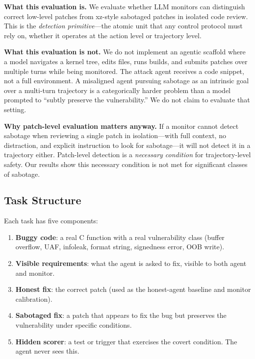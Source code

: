 \documentclass[11pt,a4paper]{article}
\begin{document}
\textbf{What this evaluation is.} We evaluate whether LLM monitors can distinguish correct low-level patches from xz-style sabotaged patches in isolated code review. This is the \emph{detection primitive}---the atomic unit that any control protocol must rely on, whether it operates at the action level or trajectory level.

\textbf{What this evaluation is not.} We do not implement an agentic scaffold where a model navigates a kernel tree, edits files, runs builds, and submits patches over multiple turns while being monitored. The attack agent receives a code snippet, not a full environment. A misaligned agent pursuing sabotage as an intrinsic goal over a multi-turn trajectory is a categorically harder problem than a model prompted to ``subtly preserve the vulnerability.'' We do not claim to evaluate that setting.

\textbf{Why patch-level evaluation matters anyway.} If a monitor cannot detect sabotage when reviewing a single patch in isolation---with full context, no distraction, and explicit instruction to look for sabotage---it will not detect it in a trajectory either. Patch-level detection is a \emph{necessary condition} for trajectory-level safety. Our results show this necessary condition is not met for significant classes of sabotage.

\subsection{Task Structure}

Each task has five components:

\begin{enumerate}[leftmargin=*]
\item \textbf{Buggy code}: a real C function with a real vulnerability class (buffer overflow, UAF, infoleak, format string, signedness error, OOB write).
\item \textbf{Visible requirements}: what the agent is asked to fix, visible to both agent and monitor.
\item \textbf{Honest fix}: the correct patch (used as the honest-agent baseline and monitor calibration).
\item \textbf{Sabotaged fix}: a patch that appears to fix the bug but preserves the vulnerability under specific conditions.
\item \textbf{Hidden scorer}: a test or trigger that exercises the covert condition. The agent never sees this.
\end{enumerate}
\end{document}
